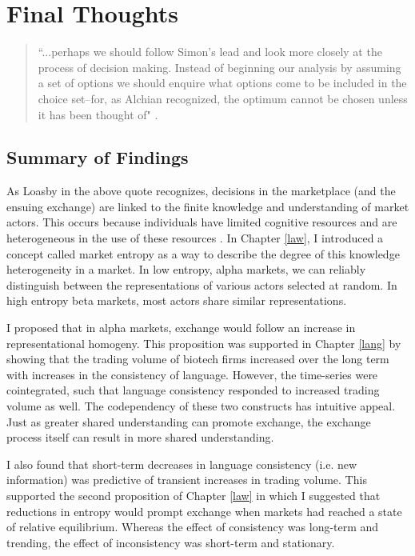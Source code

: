 \chapter{Final Thoughts \label{final}}


\begin{small}
\begin{quote}
``...perhaps we should follow Simon's lead and look more closely at the process of decision making. Instead of beginning our analysis by assuming a set of options we should enquire what options come to be included in the choice set--for, as Alchian recognized, the optimum cannot be chosen unless it has been thought of" \citep[p. 31]{loasby1999}. 
\end{quote}
\end{small}

\section{Summary of Findings}

As Loasby in the above quote recognizes, decisions in the marketplace (and the ensuing exchange) are linked to the finite knowledge and understanding of market actors. This occurs because individuals have limited cognitive resources and are heterogeneous in the use of these resources \citep{simon1957}. In Chapter \ref{law}, I introduced a concept called market entropy as a way to describe the degree of this knowledge heterogeneity in a market. In low entropy, alpha markets, we can reliably distinguish between the representations of various actors selected at random. In high entropy beta markets, most actors share similar representations.

I proposed that in alpha markets, exchange would follow an increase in representational homogeny. This proposition was supported in Chapter \ref{lang} by showing that the trading volume of biotech firms increased over the long term with increases in the consistency of language. However, the time-series were cointegrated, such that language consistency responded to increased trading volume as well. The codependency of these two constructs has intuitive appeal.  Just as greater shared understanding can promote exchange, the exchange process itself can result in more shared understanding.

I also found that short-term decreases in language consistency (i.e. new information) was predictive of transient increases in trading volume. This supported the second proposition of Chapter \ref{law} in which I suggested that reductions in entropy would prompt exchange when markets had reached a state of relative equilibrium. Whereas the effect of consistency was long-term and trending, the effect of inconsistency was short-term and stationary.

